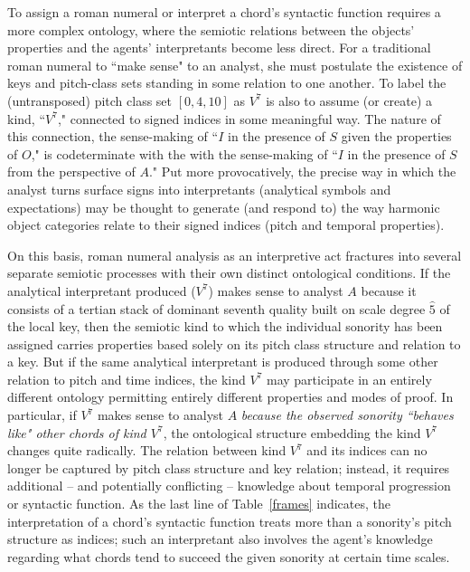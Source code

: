 To assign a roman numeral or interpret a chord's syntactic function requires a more complex ontology, where the semiotic relations between the objects' properties and the agents' interpretants become less direct.  For a traditional roman numeral to ``make sense" to an analyst, she must postulate the existence of keys and pitch-class sets standing in some relation to one another.  To label the (untransposed) pitch class set $[0,4,10]$ as $V^7$ is also to assume (or create) a kind, ``$V^7$," connected to signed indices in some meaningful way.  The nature of this connection, the sense-making of ``$I$ in the presence of $S$ given the properties of $O$," is codeterminate with the with the sense-making of ``$I$ in the presence of $S$ from the perspective of $A$."  Put more provocatively, the precise way in which the analyst turns surface signs into interpretants (analytical symbols and expectations) may be thought to generate (and respond to) the way harmonic object categories relate to their signed indices (pitch and temporal properties).

On this basis, roman numeral analysis as an interpretive act fractures into several separate semiotic processes with their own distinct ontological conditions.  If the analytical interpretant produced ($V^7$) makes sense to analyst $A$ because it consists of a tertian stack of dominant seventh quality built on scale degree $\hat{5}$ of the local key, then the semiotic kind to which the individual sonority has been assigned carries properties based solely on its pitch class structure and relation to a key.  But if the same analytical interpretant is produced through some other relation to pitch and time indices, the kind $V^7$ may participate in an entirely different ontology permitting entirely different properties and modes of proof.  In particular, if $V^7$ makes sense to analyst $A$ \emph{because the observed sonority ``behaves like" other chords of kind $V^7$}, the ontological structure embedding the kind $V^7$ changes quite radically.  The relation between kind $V^7$ and its indices can no longer be captured by pitch class structure and key relation; instead, it requires additional -- and potentially conflicting -- knowledge about temporal progression or syntactic function.  As the last line of Table~\ref{frames} indicates, the interpretation of a chord's syntactic function treats more than a sonority's pitch structure as indices; such an interpretant also involves the agent's knowledge regarding what chords tend to succeed the given sonority at certain time scales.

